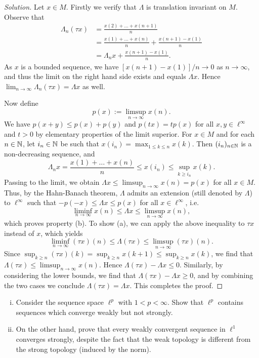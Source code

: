 \begin{proof}[Solution]
	Let $x \in M$. Firstly we verify that $\Lambda$ is translation invariant on $M$. Observe that
	\begin{align*}
		\Lambda_n(\tau x) &= \frac{x(2)+\ldots+x(n+1)}{n} \\
		&= \frac{x(1)+\ldots+x(n)}{n} + \frac{x(n+1)-x(1)}{n} \\
		&= \Lambda_n x + \frac{x(n+1)-x(1)}{n}.
	\end{align*}
	As $x$ is a bounded sequence, we have $[x(n+1)-x(1)]/n \to 0$ as $n\to\infty$, and thus the limit on the right hand side exists and equals $\Lambda x$. Hence $\lim_{n\to\infty} \Lambda_n (\tau x) = \Lambda x$ as well. 
	
	Now define
	\begin{equation*}
		p(x) := \limsup_{n\to\infty} x(n).
	\end{equation*}
	We have $p(x+y) \le p(x)+p(y)$ and $p(tx) = tp(x)$ for all $x,y \in \ell^\infty$ and $t>0$ by elementary properties of the limit superior. For $x \in M$ and for each $n\in\mathbb{N}$, let $i_n \in \mathbb{N}$ be such that $x(i_n) = \max_{1\le k \le n} x(k)$. Then $(i_n)_{n\in\mathbb{N}}$ is a non-decreasing sequence, and
	\begin{equation*}
		\Lambda_n x = \frac{x(1)+\ldots+x(n)}{n} \le x(i_n) \le \sup_{k \ge i_n} x(k).
	\end{equation*}
	Passing to the limit, we obtain $\Lambda x \le \limsup_{n\to\infty}x(n) = p(x)$ for all $x \in M$. Thus, by the Hahn-Banach theorem, $\Lambda$ admits an extension (still denoted by $\Lambda$) to $\ell^\infty$ such that $-p(-x) \le \Lambda x \le p(x)$ for all $x \in \ell^\infty$, i.e.
	\begin{equation*}
		\liminf_{n\to\infty} x(n) \le \Lambda x \le \limsup_{n\to\infty} x(n),
	\end{equation*}
	which proves property (b). To show (a), we can apply the above inequality to $\tau x$ instead of $x$, which yields
	\begin{equation*}
		\liminf_{n\to\infty} (\tau x)(n) \le \Lambda(\tau x) \le \limsup_{n\to\infty} (\tau x)(n).
	\end{equation*}
	Since $\sup_{k \ge n} (\tau x)(k) = \sup_{k \ge n} x(k+1) \le \sup_{k \ge n}x(k)$, we find that $\Lambda (\tau x) \le \limsup_{n\to\infty} x(n)$. Hence $\Lambda(\tau x) - \Lambda x \le 0$. Similarly, by considering the lower bounds, we find that $\Lambda(\tau x) - \Lambda x \ge 0$, and by combining the two cases we conclude $\Lambda (\tau x) = \Lambda x$. This completes the proof.
\end{proof}

\begin{exercise}[Ex.\ 5(b),(c)]
	\begin{enumerate}[(i)]
		\item Consider the sequence space $\ell^p$ with $1 < p < \infty$. Show that $\ell^p$ contains sequences which converge weakly but not strongly.
		\item On the other hand, prove that every weakly convergent sequence in $\ell^1$ converges strongly, despite the fact that the weak topology is different from the strong topology (induced by the norm).
	\end{enumerate}
\end{exercise}